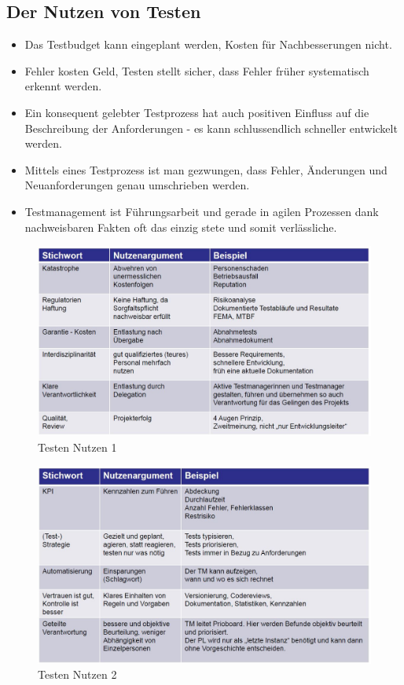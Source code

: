 \subsection{Der Nutzen von Testen}

\begin{itemize}
	\item Das Testbudget kann eingeplant werden, Kosten für Nachbesserungen nicht.
	\item Fehler kosten Geld, Testen stellt sicher, dass Fehler früher systematisch erkennt werden.
	\item Ein konsequent gelebter Testprozess hat auch positiven Einfluss auf die Beschreibung der Anforderungen - es kann schlussendlich schneller entwickelt werden.
	\item Mittels eines Testprozess ist man gezwungen, dass Fehler, Änderungen und Neuanforderungen genau umschrieben werden.
	\item Testmanagement ist Führungsarbeit und gerade in agilen Prozessen dank nachweisbaren Fakten oft das einzig stete und somit verlässliche.
\end{itemize}

\begin{figure}[h!]
\centering
\includegraphics[width=0.7\linewidth]{fig/testen-nutzen-1}
\caption{Testen Nutzen 1}
\label{fig:testen-nutzen-1}
\end{figure}

\begin{figure}[h!]
	\centering
	\includegraphics[width=0.7\linewidth]{fig/testen-nutzen-2}
	\caption{Testen Nutzen 2}
	\label{fig:testen-nutzen-2}
\end{figure}


